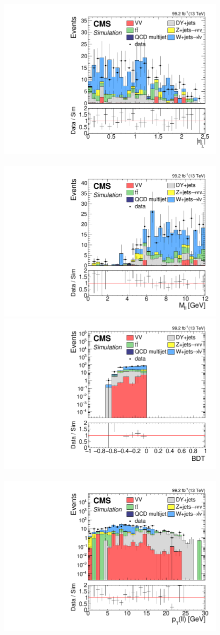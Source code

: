 \begin{figure}[!htb]
\centering
\includegraphics[width=0.48\linewidth]{plots/dilepton_muons_data_control_region_phase1/none_abs(LeadingJet.Eta()).pdf} \,
\includegraphics[width=0.48\linewidth]{plots/dilepton_muons_data_control_region_phase1/none_invMassCorrJetNoMultIso10Dr0.6.pdf} \\

\includegraphics[width=0.48\linewidth]{plots/dilepton_muons_data_control_region_phase1/none_custom_dilepBDTCorrJetNoMultIso10Dr0.6_log.pdf} \,
\includegraphics[width=0.48\linewidth]{plots/dilepton_muons_data_control_region_phase1/none_dileptonPtCorrJetNoMultIso10Dr0.6_log.pdf} \\


\end{figure}

